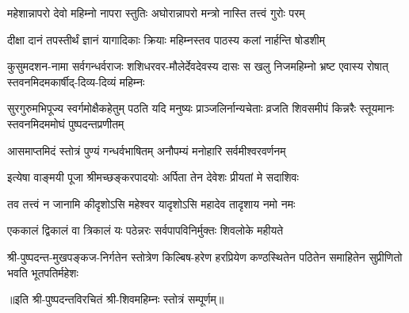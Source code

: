 \twolineshloka
{महेशान्नापरो देवो महिम्नो नापरा स्तुतिः}
{अघोरान्नापरो मन्त्रो नास्ति तत्त्वं गुरोः परम्}%

\twolineshloka
{दीक्षा दानं तपस्तीर्थं ज्ञानं यागादिकाः क्रियाः}
{महिम्नस्तव पाठस्य कलां नार्हन्ति षोडशीम्}%

\fourlineindentedshloka
{कुसुमदशन-नामा सर्वगन्धर्वराजः}
{शशिधरवर-मौलेर्देवदेवस्य दासः}
{स खलु निजमहिम्नो भ्रष्ट एवास्य रोषात्}
{स्तवनमिदमकार्षीद्-दिव्य-दिव्यं महिम्नः}%

\fourlineindentedshloka
{सुरगुरुमभिपूज्य स्वर्गमोक्षैकहेतुम्}
{पठति यदि मनुष्यः प्राञ्जलिर्नान्यचेताः}
{व्रजति शिवसमीपं किन्नरैः स्तूयमानः}
{स्तवनमिदममोघं पुष्पदन्तप्रणीतम्}%

\twolineshloka
{आसमाप्तमिदं स्तोत्रं पुण्यं गन्धर्वभाषितम्}
{अनौपम्यं मनोहारि सर्वमीश्वरवर्णनम्}%

\twolineshloka
{इत्येषा वाङ्मयी पूजा श्रीमच्छङ्करपादयोः}
{अर्पिता तेन देवेशः प्रीयतां मे सदाशिवः}%

\twolineshloka
{तव तत्त्वं न जानामि कीदृशोऽसि महेश्वर}
{यादृशोऽसि महादेव तादृशाय नमो नमः}%

\twolineshloka
{एककालं द्विकालं वा त्रिकालं यः पठेन्नरः}
{सर्वपापविनिर्मुक्तः शिवलोके महीयते}%

\fourlineindentedshloka
{श्री-पुष्पदन्त-मुखपङ्कज-निर्गतेन}
{स्तोत्रेण किल्बिष-हरेण हरप्रियेण}
{कण्ठस्थितेन पठितेन समाहितेन}
{सुप्रीणितो भवति भूतपतिर्महेशः}%

॥इति श्री-पुष्पदन्तविरचितं श्री-शिवमहिम्नः स्तोत्रं सम्पूर्णम्॥